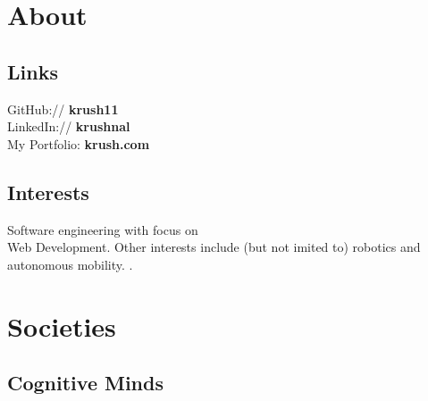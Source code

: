 \documentclass[letterpaper]{deedy-resume} %
\begin{document}
\begin{minipage}[t]{0.33\textwidth}

\sectionspace %

\section{About} 

\subsection{Links}
GitHub:// {\bf krush11} \\
LinkedIn:// {\bf krushnal} \\
My Portfolio: \textbf{krush.com} \\

\sectionspace

\subsection{Interests}
Software engineering with focus on \\
Web Development. Other interests include 
(but not imited to) robotics and autonomous mobility. .

\sectionspace %

\section{Societies}
\subsection{Cognitive Minds}

\sectionspace %

\end{minipage} %
\hfill
%
%
\end{document}
